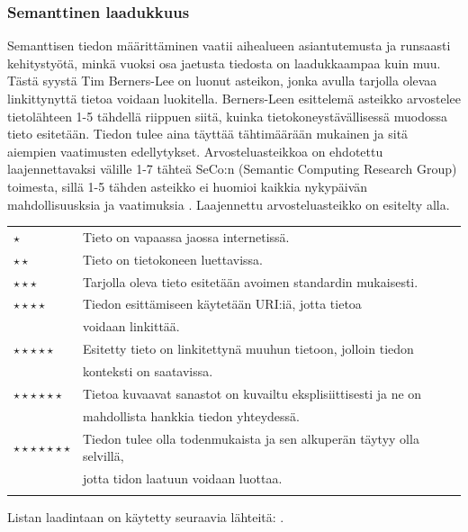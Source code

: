 \documentclass[finnish, 12pt, a4paper, elec, utf8, pdfa, online]{aaltothesis}
\begin{document}
{%


\subsubsection{Semanttinen laadukkuus} %
Semanttisen tiedon määrittäminen vaatii aihealueen asiantutemusta ja runsaasti kehitystyötä, minkä vuoksi osa jaetusta tiedosta on laadukkaampaa kuin muu. Tästä syystä Tim Berners-Lee on luonut asteikon, jonka avulla tarjolla olevaa linkittynyttä tietoa voidaan luokitella. Berners-Leen esittelemä asteikko arvostelee tietolähteen 1-5 tähdellä riippuen siitä, kuinka tietokoneystävällisessä muodossa tieto esitetään. Tiedon tulee aina täyttää tähtimäärään mukainen ja sitä aiempien vaatimusten edellytykset. Arvosteluasteikkoa on ehdotettu laajennettavaksi välille 1-7 tähteä SeCo:n (Semantic Computing Research Group) toimesta, sillä 1-5 tähden asteikko ei huomioi kaikkia nykypäivän mahdollisuusksia ja vaatimuksia \cite{SeCo_stars}. Laajennettu arvosteluasteikko on esitelty alla.

\begin{tabular}{ll}
\vspace*{0.2cm}
$\star$                     & Tieto on vapaassa jaossa internetissä. \\
\vspace*{0.2cm}
$\star\star$                & Tieto on tietokoneen luettavissa. \\
\vspace*{0.2cm}
$\star\star\star$           & Tarjolla oleva tieto esitetään avoimen standardin mukaisesti. \\

$\star\star\star\star$      & Tiedon esittämiseen käytetään URI:iä, jotta tietoa \\
\vspace*{0.2cm}             & voidaan linkittää. \\
$\star\star\star\star\star$ & Esitetty tieto on linkitettynä muuhun tietoon, jolloin tiedon \\        \vspace*{0.5cm}             & konteksti on saatavissa. \\
$\star\star\star\star\star\star$     & Tietoa kuvaavat sanastot on kuvailtu eksplisiittisesti ja ne on\\   \vspace*{0.2cm}               & mahdollista hankkia tiedon yhteydessä. \\
$\star\star\star\star\star\star\star$   & Tiedon tulee olla todenmukaista ja sen alkuperän täytyy olla selvillä, \\                & jotta tidon laatuun voidaan luottaa. \\ \vspace*{0.05cm}
\end{tabular}
Listan laadintaan on käytetty seuraavia lähteitä: \cite{SeCo_stars} \cite{SeCo_stars2} \cite{Tim-BL}.

}
\end{document}
